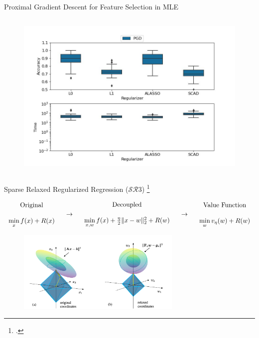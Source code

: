 \documentclass[8pt]{beamer}
\begin{document}
\begin{frame}{Proximal Gradient Descent for Feature Selection in MLE}
{\begin{columns}[T,onlytextwidth]
    	\vspace{1em}
    	\centering  
		\begin{figure}
			\includegraphics[width=\textwidth]{Figures/benchmark_pgd.jpg}
		\end{figure}
  \end{columns}
}
\end{frame}


\begin{frame}{Sparse Relaxed Regularized Regression ($\mathcal{SR}3$) \footcite{Zheng2018RelaxAndSplit}}

\begin{equation*}
		\begin{array}{c}
			\text{Original} \\
			 \\
			\min\limits_{x} f(x) + R(x)
		\end{array}
	\quad \rightarrow \quad 
	\begin{array}{c}
		\text{Decoupled} \\
		\\
		\min\limits_{x, w} f(x) + \frac{\eta}{2} \|x-w\|_2^2 + R(w) 
	\end{array}
	\quad \rightarrow \quad 
	\begin{array}{c}
		\text{Value Function} \\
		\\
		\min\limits_{w} v_\eta(w) + R(w)
	\end{array}
\end{equation*}

\begin{figure}
	\includegraphics[width=0.7\textwidth]{Figures/intuition_prev_paper.png}
\end{figure}

\end{frame}
\end{document}
